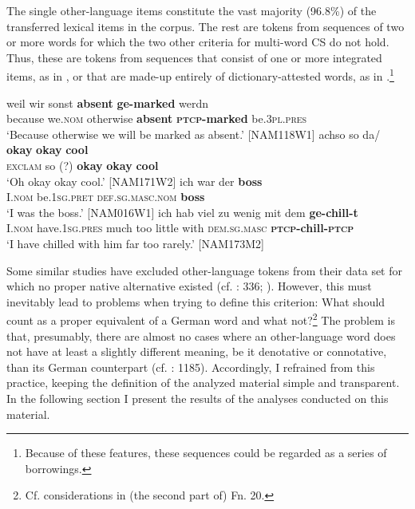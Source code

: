 \documentclass[output=paper]{langsci/langscibook}
\begin{document}
The single other-language items constitute the vast majority (96.8\%) of the transferred lexical items in the corpus. The rest are tokens from sequences of two or more words for which the two other criteria for multi-word CS do not hold. Thus, these are tokens from sequences that consist of one or more integrated items, as in , or that are made-up entirely of dictionary-attested words, as in .\footnote{Because of these features, these sequences could be regarded as a series of borrowings.}

\ea
\label{ex:bracke:4}
\gll weil wir sonst \textbf{absent} \textbf{ge-marked} werdn\\
     because we.\textsc{nom} otherwise \textbf{absent} \textbf{\textsc{ptcp-}}\textbf{marked} be.\textsc{3pl.pres}\\
\glt `Because otherwise we will be marked as absent.' {[}NAM118W1{]}
\ex\label{ex:bracke:5}
	\gll achso so da/ \textbf{okay} \textbf{okay} \textbf{cool}     \\
     \textsc{exclam} so (?) \textbf{okay} \textbf{okay} \textbf{cool}\\
	\glt `Oh okay okay cool.' {[}NAM171W2{]}
\ex
\label{ex:bracke:6}
\gll ich war der \textbf{boss}\\
     I.\textsc{nom} be.\textsc{1sg.pret} \textsc{def.sg.masc.nom} \textbf{boss}\\
\glt `I was the boss.' {[}NAM016W1{]}
\ex
\label{ex:bracke:7}
\gll ich hab viel zu wenig mit dem \textbf{ge-chill-t}  \\
     I.\textsc{nom} have.1\textsc{sg.pres} much too little with \textsc{dem.sg.masc} \textbf{\textsc{ptcp-}}\textbf{chill-\textsc{ptcp}}\\
\glt `I have chilled with him far too rarely.' {[}NAM173M2{]}
\z

Some similar studies have excluded other-language tokens from their data set for which no proper native alternative existed (cf. \citealt{zenner_sociolinguistic_2015}: 336; \citealt{calude_modelling_2017}). However, this must inevitably lead to problems when trying to define this criterion: What should count as a proper equivalent of a German word and what not?\footnote{Cf. considerations in (the second part of) Fn. 20.} The problem is that, presumably, there are almost no cases where an other-language word does not have at least a slightly different meaning, be it denotative or connotative, than its German counterpart (cf. \citealt{zimmer_deutsch_2019}: 1185). Accordingly, I refrained from this practice, keeping the definition of the analyzed material simple and transparent. In the following section I present the results of the analyses conducted on this material.
\end{document}
